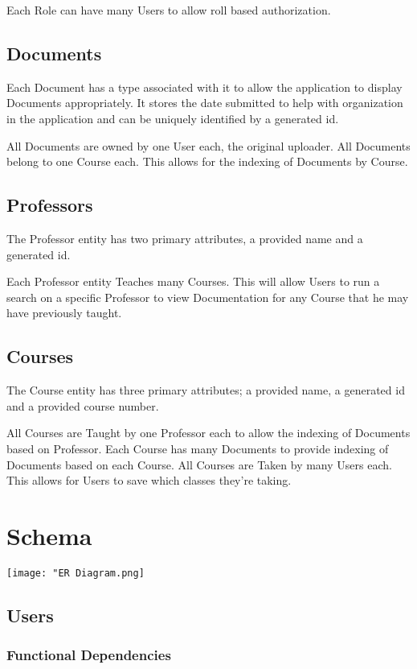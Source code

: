 \documentclass[11pt]{article}
\begin{document}
   Each Role can have many Users to allow roll based authorization.
\subsection*{Documents}
\label{sec-2-3}


   Each Document has a type associated with it to allow the
   application to display Documents appropriately. It stores the date
   submitted to help with organization in the application and can be
   uniquely identified by a generated id.

   All Documents are owned by one User each, the original
   uploader. All Documents belong to one Course each. This allows for
   the indexing of Documents by Course.
\subsection*{Professors}
\label{sec-2-4}


   The Professor entity has two primary attributes, a provided name
   and a generated id. 
   
   Each Professor entity Teaches many Courses. This will allow Users
   to run a search on a specific Professor to view Documentation for
   any Course that he may have previously taught.
\subsection*{Courses}
\label{sec-2-5}


   The Course entity has three primary attributes; a provided name, a
   generated id and a provided course number.  

   All Courses are Taught by one Professor each to allow the indexing of
   Documents based on Professor. Each Course has many Documents to
   provide indexing of Documents based on each Course. All Courses
   are Taken by many Users each. This allows for Users to save which
   classes they're taking.
\section*{Schema}
\label{sec-3}


  \texttt{[image: "ER Diagram.png]}
\subsection*{Users}
\label{sec-3-1}
\subsubsection*{Functional Dependencies}
\label{sec-3-1-1}
\end{document}
